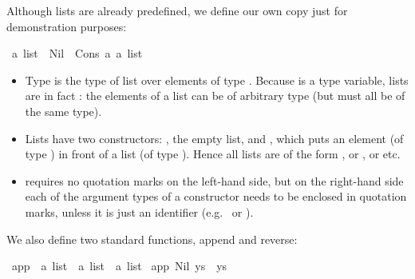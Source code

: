 \begin{isabellebody}
\begin{isamarkuptxt}
Although lists are already predefined, we define our own copy just for
demonstration purposes:%
\end{isamarkuptxt}%
\isamarkuptrue%
%
\endisatagproof
{\isafoldproof}%
%
\isadelimproof
%
\endisadelimproof
{}\isamarkupfalse%
\ {}a\ list\ {}\ Nil\ {}\ Cons\ {}a\ {}{}a\ list{}%
\begin{isamarkuptext}%
\begin{itemize}
\item Type  is the type of list over elements of type . Because  is a type variable, lists are in fact : the elements of a list can be of arbitrary type (but must all be of the same type).
\item Lists have two constructors: , the empty list, and , which puts an element (of type ) in front of a list (of type ).
Hence all lists are of the form , or ,
or  etc.
\item {} requires no quotation marks on the
left-hand side, but on the right-hand side each of the argument
types of a constructor needs to be enclosed in quotation marks, unless
it is just an identifier (e.g.\  or ).
\end{itemize}
We also define two standard functions, append and reverse:%
\end{isamarkuptext}%
\isamarkuptrue%
\isamarkupfalse%
\ app\ {}{}\ {}{}a\ list\ {}\ {}a\ list\ {}\ {}a\ list{}\ \isanewline
{}app\ Nil\ ys\ {}\ ys{}\ {}\isanewline

\end{isabellebody}
